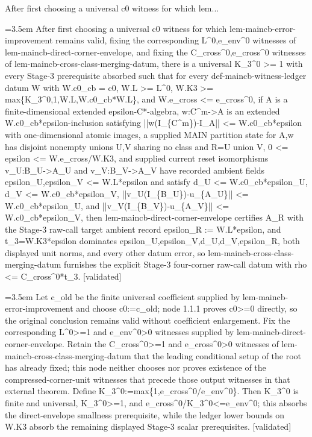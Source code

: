 \documentclass{article}
\newcommand{\step}[1]{\par\noindent\hangindent=3.5em\hangafter=1%
  \makebox[3.5em][l]{\textbf{#1.}}}
\newcommand{\steptag}[1]{\hfill{\small\textsf{[#1]}}}
\begin{document}
\begin{proofbox}{After first choosing a universal c0 witness for which lem...}
\step{1} After first choosing a universal c0 witness for which lem-maincb-error-improvement remains valid, fixing the corresponding L\textasciicircum{}0,e\_env\textasciicircum{}0 witnesses of lem-maincb-direct-corner-envelope, and fixing the C\_cross\textasciicircum{}0,e\_cross\textasciicircum{}0 witnesses of lem-maincb-cross-class-merging-datum, there is a universal K\_3\textasciicircum{}0 >= 1 with every Stage-3 prerequisite absorbed such that for every def-maincb-witness-ledger datum W with W.c0\_cb = c0, W.L >= L\textasciicircum{}0, W.K3 >= max\{K\_3\textasciicircum{}0,1,W.L,W.c0\_cb*W.L\}, and W.e\_cross <= e\_cross\textasciicircum{}0, if A is a finite-dimensional extended epsilon-C*-algebra, w:C\textasciicircum{}m->A is an extended W.c0\_cb*epsilon-inclusion satisfying ||w(I\_\{C\textasciicircum{}m\})-I\_A|| <= W.c0\_cb*epsilon with one-dimensional atomic images, a supplied MAIN partition state for A,w has disjoint nonempty unions U,V sharing no class and R=U union V, 0 <= epsilon <= W.e\_cross/W.K3, and supplied current reset isomorphisms v\_U:B\_U->A\_U and v\_V:B\_V->A\_V have recorded ambient fields epsilon\_U,epsilon\_V <= W.L*epsilon and satisfy d\_U <= W.c0\_cb*epsilon\_U, d\_V <= W.c0\_cb*epsilon\_V, ||v\_U(I\_\{B\_U\})-u\_\{A\_U\}|| <= W.c0\_cb*epsilon\_U, and ||v\_V(I\_\{B\_V\})-u\_\{A\_V\}|| <= W.c0\_cb*epsilon\_V, then lem-maincb-direct-corner-envelope certifies A\_R with the Stage-3 raw-call target ambient record epsilon\_R := W.L*epsilon, and t\_3=W.K3*epsilon dominates epsilon\_U,epsilon\_V,d\_U,d\_V,epsilon\_R, both displayed unit norms, and every other datum error, so lem-maincb-cross-class-merging-datum furnishes the explicit Stage-3 four-corner raw-call datum with rho <= C\_cross\textasciicircum{}0*t\_3. \steptag{validated} \\[6pt]
\step{1.1} Let c\_old be the finite universal coefficient supplied by lem-maincb-error-improvement and choose c0:=c\_old; node 1.1.1 proves c0>=0 directly, so the original conclusion remains valid without coefficient enlargement. Fix the corresponding L\textasciicircum{}0>=1 and e\_env\textasciicircum{}0>0 witnesses supplied by lem-maincb-direct-corner-envelope. Retain the C\_cross\textasciicircum{}0>=1 and e\_cross\textasciicircum{}0>0 witnesses of lem-maincb-cross-class-merging-datum that the leading conditional setup of the root has already fixed; this node neither chooses nor proves existence of the compressed-corner-unit witnesses that precede those output witnesses in that external theorem. Define K\_3\textasciicircum{}0:=max\{1,e\_cross\textasciicircum{}0/e\_env\textasciicircum{}0\}. Then K\_3\textasciicircum{}0 is finite and universal, K\_3\textasciicircum{}0>=1, and e\_cross\textasciicircum{}0/K\_3\textasciicircum{}0<=e\_env\textasciicircum{}0; this absorbs the direct-envelope smallness prerequisite, while the ledger lower bounds on W.K3 absorb the remaining displayed Stage-3 scalar prerequisites. \steptag{validated} \\[6pt]

\end{proofbox}
\end{document}
